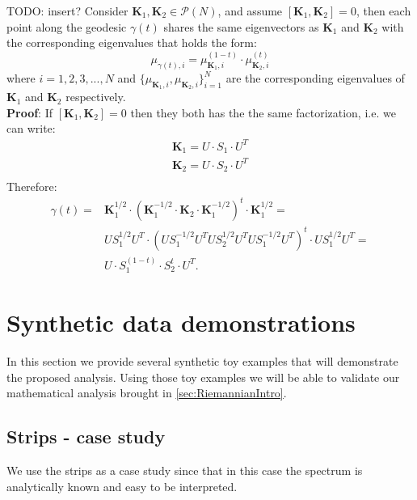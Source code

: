\documentclass[]{article}
\theoremstyle{definition}
\begin{document}
	
	TODO: insert?
	Consider $\mathbf{K}_1,\mathbf{K}_2 \in \mathcal{P}(N)$, and assume $[\mathbf{K}_1,\mathbf{K}_2]=0$, then each point along the geodesic $\gamma(t)$ shares the same eigenvectors as $\mathbf{K}_1$ and $\mathbf{K}_2$ with the corresponding eigenvalues that holds the form: 
	\begin{equation}
	\mu_{\gamma(t),i} = \mu_{\mathbf{K}_1,i}^{(1-t)} \cdot \mu_{\mathbf{K}_2,i}^{(t)} 
	\label{eq:CommonEigenVals2}
	\end{equation}
	where $i=1,2,3,...,N$ and $ \{ \mu_{\mathbf{K}_1,i}, \mu_{\mathbf{K}_2,i} \}_{i=1}^N$ are the corresponding eigenvalues of $\mathbf{K}_1$ and $\mathbf{K}_2$ respectively.\\
	\textbf{Proof}:
	If $[\mathbf{K}_1,\mathbf{K}_2]=0$ then they both has the the same factorization, i.e. we can write:
	\begin{eqnarray*}
		\mathbf{K}_1 = U\cdot S_1 \cdot U^T \\ 
		\mathbf{K}_2 = U\cdot S_2 \cdot U^T \\ 
	\end{eqnarray*}
	Therefore:
	\begin{equation}
	\begin{aligned}
	\gamma(t)= & \mathbf{K}_1^{1/2}\cdot( \mathbf{K}_1^{-1/2} \cdot \mathbf{K}_2 \cdot \mathbf{K}_1^{-1/2})^t \cdot \mathbf{K}_1^{1/2} =\\
	& U S_1^{1/2}  U^T \cdot(U S_1^{-1/2}  U^T  U S_2^{1/2}  U^T  U S_1^{-1/2}  U^T )^t \cdot U S_1^{1/2}  U^T = \\
	& U\cdot S_1^{(1-t)} \cdot S_2^{t}\cdot U^T.
	\end{aligned}
	\end{equation}
	
	
	
	
	\section{Synthetic data demonstrations}
	\label{sec:SynthData}
	In this section we provide several synthetic toy examples that will demonstrate the proposed analysis. Using those toy examples we will be able to validate our mathematical analysis brought in \ref{sec:RiemannianIntro}.
	
	\subsection{Strips - case study}
	\label{subsec:Strips}
	We use the strips as a case study since that in this case the spectrum is analytically known and easy to be interpreted.
	
\end{document}
